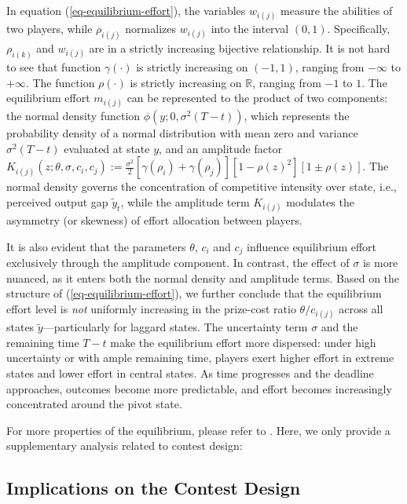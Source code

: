 \documentclass[mnsc]{informs3}
\begin{document}
In equation (\ref{eq-equilibrium-effort}), the variables $w_{i(j)}$ measure the abilities of two players, while $\rho_{i(j)}$ normalizes $w_{i(j)}$ into the interval $(0, 1)$. 
Specifically, $\rho_{i(k)}$ and $w_{i(j)}$ are in a strictly increasing bijective relationship. 
It is not hard to see that function $\gamma(\cdot)$ is strictly increasing on $(-1,1)$, ranging from $-\infty$ to $+\infty$. 
The function $\rho(\cdot)$ is strictly increasing on $\mathbb{R}$, ranging from $-1$ to $1$. 
The equilibrium effort $m_{i(j)}$ can be represented to the product of two components:
the normal density function $\phi(y; 0, \sigma^2(T-t))$, which represents the probability density of a normal distribution with mean zero and variance $\sigma^2(T-t)$ evaluated at state $y$, and an amplitude factor $K_{i(j)}(z; \theta, \sigma, c_i, c_j) := \frac{\sigma^2}{2}\left[\gamma(\rho_{i}) + \gamma(\rho_{j})\right]\left[1-\rho(z)^2\right]\left[1 \pm \rho(z)\right]$. 
The normal density governs the concentration of competitive intensity over state, i.e., perceived output gap $\tilde{y}_t$, while the amplitude term $K_{i(j)}$ modulates the asymmetry (or skewness) of effort allocation between players.

It is also evident that the parameters $\theta$, $c_i$ and $c_j$ influence equilibrium effort exclusively through the amplitude component.
In contrast, the effect of $\sigma$ is more nuanced, as it enters both the normal density and amplitude terms. 
Based on the structure of (\ref{eq-equilibrium-effort}), we further conclude that the equilibrium effort level is \textit{not} uniformly increasing in the prize-cost ratio $\theta/c_{i(j)}$ across all states $\tilde{y}$—particularly for laggard states.
The uncertainty term $\sigma$ and the remaining time $T - t$ make the equilibrium effort more dispersed: under high uncertainty or with ample remaining time, players exert higher effort in extreme states and lower effort in central states.
As time progresses and the deadline approaches, outcomes become more predictable, and effort becomes increasingly concentrated around the pivot state.

For more properties of the equilibrium, please refer to \citet{Ryvkin2022Fight}. 
Here, we only provide a supplementary analysis related to contest design:


\subsection{Implications on the Contest Design}
\end{document}
